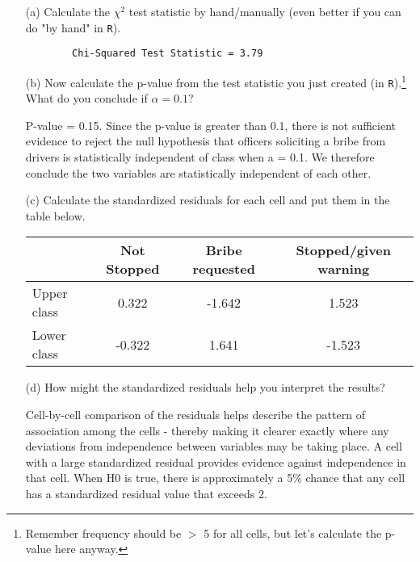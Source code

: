 \documentclass[12pt,letterpaper]{article}
\begin{document}
\begin{enumerate}
	
	\item [(a)]
	Calculate the $\chi^2$ test statistic by hand/manually (even better if you can do "by hand" in \texttt{R}).\\
	\vspace{0.1cm}
	
	
	\begin{verbatim}
		Chi-Squared Test Statistic = 3.79
	\end{verbatim} 
	
	
	\item [(b)]
	Now calculate the p-value from the test statistic you just created (in \texttt{R}).\footnote{Remember frequency should be $>$ 5 for all cells, but let's calculate the p-value here anyway.}  What do you conclude if $\alpha = 0.1$?\\
	
	\newpage
	
	
	\noindent
	P-value = 0.15. Since the p-value is greater than 0.1, there is not sufficient evidence to reject the null hypothesis that officers soliciting a bribe from drivers is statistically independent of class when a = 0.1. We therefore conclude the two variables are statistically independent of each other.
	
	
	\item [(c)] Calculate the standardized residuals for each cell and put them in the table below.
	\vspace{1cm}
	
	\begin{table}[h]
		\centering
		\begin{tabular}{l | c c c }
			& Not Stopped & Bribe requested & Stopped/given warning \\
			\hline
			Upper class  & 0.322 & -1.642 & 1.523 \\
			Lower class  & -0.322& 1.641 & -1.523 \\ 
		\end{tabular}
	\end{table}
	
	
	\vspace{1cm}
	\item [(d)] How might the standardized residuals help you interpret the results? 
	 
	\noindent
	 Cell-by-cell comparison of the residuals helps describe the pattern of association among the cells - thereby making it clearer exactly where any deviations from independence between variables may be taking place. A cell with a large standardized residual provides evidence against independence in that cell. When H0 is true, there is approximately a 5\% chance that any cell has a standardized residual value that exceeds 2.
	 

\end{enumerate}
\end{document}
